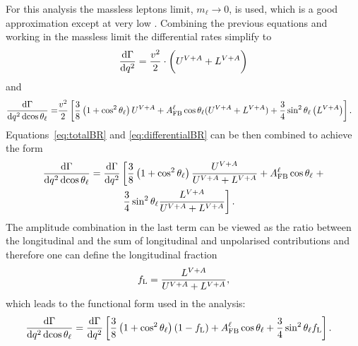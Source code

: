 %
%
%
%
For this analysis the massless leptons limit, $m_\ell \rightarrow 0$, is used, which is a good
approximation except at very low \qsq. Combining the previous equations and working in the massless 
limit the differential rates simplify to
\begin{eqnarray}
\frac{\mathrm{d}\Gamma}{\mathrm{d} q^2}=
\frac{v^{2}}{2}\cdot\bigg( U^{V+A} + L^{V+A} \bigg)
\label{eq:totalBR}
\end{eqnarray}
and
\begin{align}
\frac{\mathrm{d}\Gamma}{\mathrm{d}q^2\,\mathrm{d}\!\cos\theta_\ell}=&
\frac{v^2}{2} \left[ \frac{3}{8}\left(1+\cos^2\theta_\ell\right)U^{V+A}+
A_{\rm FB}^\ell\cos\theta_\ell(U^{V+A} + L^{V+A})+
\frac{3}{4}\sin^2\theta_\ell \left(L^{V+A}\right) \right].
\label{eq:differentialBR}
\end{align}
%
%
Equations~\ref{eq:totalBR} and \ref{eq:differentialBR} can be then combined to achieve the form
\begin{align}
\frac{\mathrm{d}\Gamma}{\mathrm{d}q^2\,\mathrm{d}\!\cos\theta_\ell}=
\frac{\mathrm{d}\Gamma}{\mathrm{d}q^2}&\left[
\frac{3}{8}\left(1+\cos^2\theta_\ell\right)\frac{U^{V+A}}{U^{V+A}+L^{V+A}}+A_{\rm FB}^\ell\cos\theta_\ell\right . +
 \nonumber \\
& \left. \frac{3}{4}\sin^2\theta_\ell\frac{L^{V+A}}{U^{V+A}+L^{V+A}}\right].
\end{align}
The amplitude combination in the last term can be viewed as the ratio between the longitudinal and the sum of
longitudinal and unpolarised contributions and therefore one can define the longitudinal fraction
\begin{equation}
f_{\rm L}=\frac{L^{V+A}}{U^{V+A}+L^{V+A}},
\end{equation}
which leads to the functional form used in the analysis:
\begin{align}
\frac{\mathrm{d}\Gamma}{\mathrm{d}q^2\,\mathrm{d}\!\cos\theta_\ell}=
\frac{\mathrm{d}\Gamma}{\mathrm{d}q^2}&\left[  \frac{3}{8}\left(1+\cos^2\theta_\ell\right)(1-f_{\rm L})+A_{\rm FB}^\ell\cos\theta_\ell +
   \frac{3}{4}\sin^2\theta_\ell f_{\rm L}\right]. 
   \label{eq:afbLTh}
\end{align}

